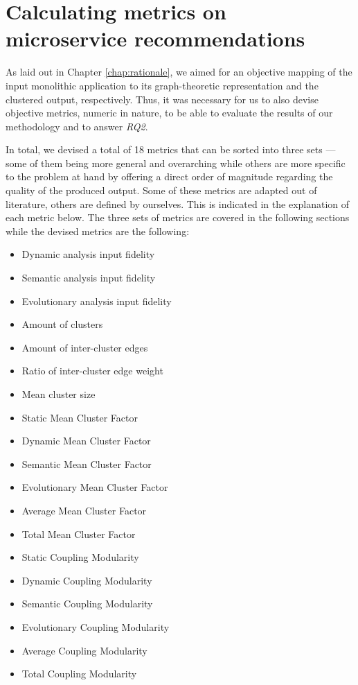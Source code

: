 \documentclass[12pt,a4paper]{report}
\begin{document}
\chapter{Calculating metrics on microservice recommendations} \label{chap:metrics}

As laid out in Chapter \ref{chap:rationale}, we aimed for an objective mapping
of the input monolithic application to its graph-theoretic representation and
the clustered output, respectively. Thus, it was necessary for us to also
devise objective metrics, numeric in nature, to be able to evaluate the results
of our methodology and to answer \textit{RQ2}.

In total, we devised a total of 18 metrics that can be sorted into three
sets --- some of them being more general and overarching while others are more
specific to the problem at hand by offering a direct order of magnitude
regarding the quality of the produced output.
Some of these metrics are adapted out of literature, others are defined by ourselves.
This is indicated in the explanation of each metric below.
The three sets of metrics are covered in the following sections
while the devised metrics are the following:
\begin{itemize}
  \item Dynamic analysis input fidelity
  \item Semantic analysis input fidelity
  \item Evolutionary analysis input fidelity
  \item Amount of clusters
  \item Amount of inter-cluster edges
  \item Ratio of inter-cluster edge weight
  \item Mean cluster size
  \item Static Mean Cluster Factor
  \item Dynamic Mean Cluster Factor
  \item Semantic Mean Cluster Factor
  \item Evolutionary Mean Cluster Factor
  \item Average Mean Cluster Factor
  \item Total Mean Cluster Factor
  \item Static Coupling Modularity
  \item Dynamic Coupling Modularity
  \item Semantic Coupling Modularity
  \item Evolutionary Coupling Modularity
  \item Average Coupling Modularity
  \item Total Coupling Modularity
\end{itemize}
\end{document}
